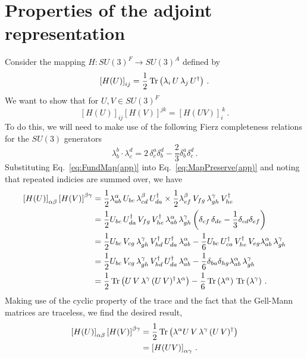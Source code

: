 \section{Properties of the adjoint representation}
\label{app:RepMapProof}
Consider the mapping $H:SU(3)^F\rightarrow SU(3)^A$ defined by
%
\begin{equation}
\left[H(U)\right]_{ij} = \frac{1}{2}\operatorname{Tr}\left(\lambda_i \, U \, \lambda_j\, U^\dagger\right)\, .
\label{eq:FundMap(app)}
\end{equation}
%
We want to show that for $U,V\in SU(3)^F$
%
\begin{equation}
\left[H(U)\right]_{ij}\left[H(V)\right]^{jk} = \left[H(U V)\right]_i^{~k}\, .
\label{eq:MapPreserve(app)}
\end{equation}
%
To do this, we will need to make use of the following Fierz completeness relations for the $SU(3)$  generators
%
\begin{equation}
\lambda _ { b } ^ { b } \cdot \lambda _ { c } ^ { d } = 2\, \delta _ { c } ^ { a } \delta _ { b } ^ { d } - \frac { 2 } { 3 } \delta _ { b } ^ { a } \delta _ { c } ^ { d }\, .
\end{equation}
%
Substituting Eq.~\eqref{eq:FundMap(app)} into Eq.~\eqref{eq:MapPreserve(app)} and noting that repeated indicies are summed over, we have
\begin{align*}
\left[H(U)\right]_{\alpha\beta}\left[H(V)\right]^{\beta\gamma} &= \frac{1}{2} \lambda^\alpha_{ab}\, U_{bc}\,\lambda^\beta_{cd}\, U^\dagger_{da} \times \frac{1}{2} \lambda^\beta_{ef}\, V_{fg}\,\lambda^\gamma_{gh}\, V^\dagger_{he}\\
&=\frac{1}{2} U_{bc}\,U^\dagger_{da}\,V_{fg}\,V^\dagger_{he}\,\lambda^\alpha_{ab}\, \lambda^\gamma_{gh} \left(\delta_{cf}\,\delta_{de} - \frac{1}{3}\delta_{cd}\delta_{ef}\right)\\
&=\frac{1}{2}U_{bc} \, V_{cg} \, \lambda^\gamma_{gh} \, V^\dagger_{hd} \, U^\dagger_{da} \, \lambda^\alpha_{ab} - \frac{1}{6} U_{bc} \, U^\dagger_{ca} \, V^\dagger_{he} \, V_{eg} \lambda^\alpha_{ab}\, \lambda^\gamma_{gh}\\
&= \frac{1}{2}U_{bc} \, V_{cg} \, \lambda^\gamma_{gh} \, V^\dagger_{hd} \, U^\dagger_{da} \, \lambda^\alpha_{ab} - \frac{1}{6}\delta_{ba}\delta_{hg} \lambda^\alpha_{ab}\, \lambda^\gamma_{gh}\\
&=\frac{1}{2}\operatorname{Tr}\left(U \, V \, \lambda^\gamma \, (U \, V)^\dagger \lambda^\alpha\right) - \frac{1}{6}\operatorname{Tr}\left(\lambda^\alpha\right) \, \operatorname{Tr}\left(\lambda^\gamma\right)\, .
\end{align*}
Making use of the cyclic property of the trace and the fact that the Gell-Mann matrices are traceless, we find the desired result,
%
\begin{align*}
\left[H(U)\right]_{\alpha\beta}\left[H(V)\right]^{\beta\gamma} &= \frac{1}{2}\operatorname{Tr}\left(\lambda^\alpha U \, V \, \lambda^\gamma \, (U \, V)^\dagger \right)\\
&= \left[H(UV)\right]_{\alpha\gamma} \, .
\end{align*}\\

